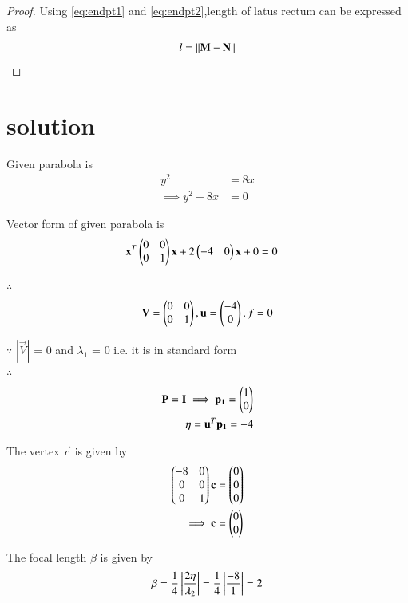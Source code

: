 \documentclass[journal,12pt,twocolumn]{IEEEtran}
\begin{document}
\begin{proof}
Using \eqref{eq:endpt1} and \eqref{eq:endpt2},length of latus rectum can be expressed as
\begin{align}
    l=\left\lVert\mathbf{M}-\mathbf{N}\right\rVert
\end{align}
\end{proof}

\section{solution}
Given parabola is 
\begin{align}
y^2 &= 8x
\\
\implies y^2 - 8x &= 0
\end{align}

Vector form of given parabola is
\begin{align}
\mathbf{x}^T\begin{pmatrix}0 & 0 \\ 0 & 1\end{pmatrix}\mathbf{x} + 2\begin{pmatrix}-4 & 0\end{pmatrix}\mathbf{x} + 0 &= 0 
\end{align}

$\therefore$
\begin{align}
 \mathbf{V} = \begin{pmatrix}0 & 0 \\ 0 & 1\end{pmatrix} ,
 \mathbf{u} = \begin{pmatrix}-4\\0\end{pmatrix} ,
 f = 0
\end{align}

$\because$
$|\vec{V}|$ = 0 and $\lambda_1$ = 0 i.e. it is in standard form
\\
$\therefore$
\begin{align}
\mathbf{P}=\mathbf{I} \implies \mathbf{p_1} = \begin{pmatrix}1\\0\end{pmatrix}
\\
\eta = \mathbf{u}^T\mathbf{p_1} = -4
\end{align}

The vertex $\vec{c}$ is given by
\begin{align}
\begin{pmatrix}-8 & 0\\0 & 0\\0 & 1\end{pmatrix}\mathbf{c} &= \begin{pmatrix}0\\0\\0\end{pmatrix}
\\
\implies \mathbf{c} &= \begin{pmatrix}0\\0\end{pmatrix}
\end{align}

The focal length $\beta$ is given by
\begin{align}
\beta = \frac{1}{4}\left\vert\frac{2\eta}{\lambda_2}\right\vert = \frac{1}{4}\left\vert\frac{-8}{1}\right\vert= 2
\end{align}
\end{document}
